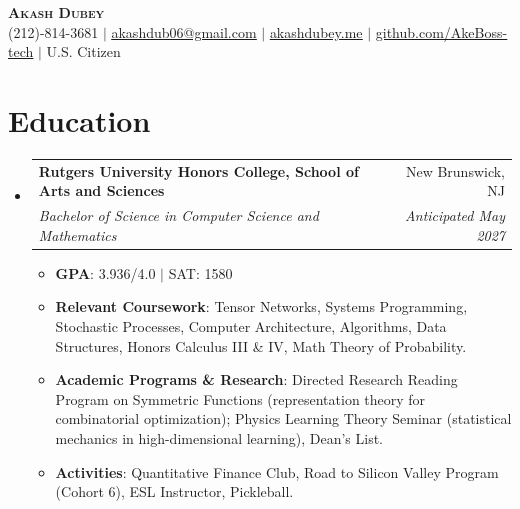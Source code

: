 \documentclass[letterpaper,11pt]{article}
\makeatletter
\newcommand{\resumeItem}[1]{
  \item\small{
    {#1 \vspace{-2pt}}
  }
}
\newcommand{\resumeSubheading}[4]{
  \vspace{-2pt}\item
    \begin{tabular*}{0.97\textwidth}[t]{l@{\extracolsep{\fill}}r}
      \textbf{#1} & #2 \\
      \textit{\small#3} & \textit{\small #4} \\
    \end{tabular*}\vspace{-7pt}
}
\newcommand{\resumeSubHeadingListStart}{\begin{itemize}[leftmargin=0.15in, label={}]}
\newcommand{\resumeSubHeadingListEnd}{\end{itemize}}
\newcommand{\resumeItemListStart}{\begin{itemize}}
\newcommand{\resumeItemListEnd}{\end{itemize}\vspace{-5pt}}
\makeatother
\begin{document}
\begin{center}
    \textbf{\Huge \scshape Akash Dubey} \\ \vspace{1pt}
    \small (212)-814-3681 $|$ \href{mailto:akashdub06@gmail.com}{\underline{akashdub06@gmail.com}} $|$
    \href{https://akashdubey.me/}{\underline{akashdubey.me}} $|$
    \href{https://github.com/AkeBoss-tech}{\underline{github.com/AkeBoss-tech}} $|$
    \small U.S. Citizen
\end{center}
\section{Education}
  \resumeSubHeadingListStart
    \resumeSubheading
      {Rutgers University Honors College, School of Arts and Sciences}{New Brunswick, NJ}
      {Bachelor of Science in Computer Science and Mathematics}{Anticipated May 2027}
      \resumeItemListStart
        \resumeItem{\textbf{GPA}: 3.936/4.0 $|$ SAT: 1580}
        \resumeItem{\textbf{Relevant Coursework}: Tensor Networks, Systems Programming, Stochastic Processes, Computer Architecture, Algorithms, Data Structures, Honors Calculus III \& IV, Math Theory of Probability.}
        \resumeItem{\textbf{Academic Programs \& Research}: Directed Research Reading Program on Symmetric Functions (representation theory for combinatorial optimization); Physics Learning Theory Seminar (statistical mechanics in high-dimensional learning), Dean's List.}
        \resumeItem{\textbf{Activities}: Quantitative Finance Club, Road to Silicon Valley Program (Cohort 6), ESL Instructor, Pickleball.}
      \resumeItemListEnd
  \resumeSubHeadingListEnd
\end{document}
